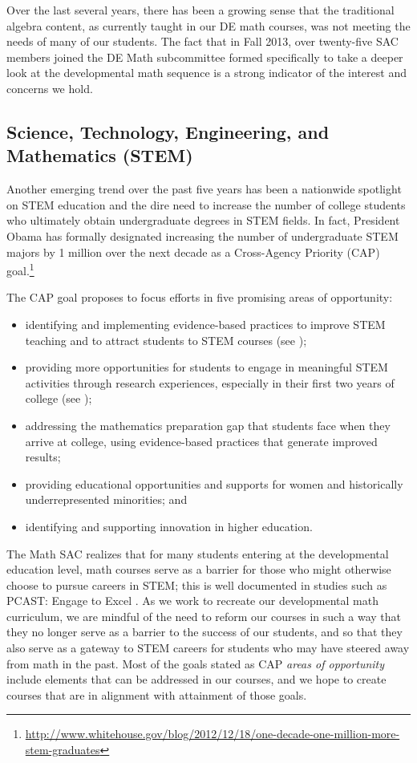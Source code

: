 Over the last several years, there has been a growing sense that the traditional
algebra content, as currently taught in our DE math courses, was not meeting the
needs of many of our students. The fact that in Fall 2013, over twenty-five SAC
members joined the DE Math subcommittee formed specifically to take a deeper
look at  the developmental math sequence is a strong indicator of the interest and
concerns we hold.

\subsection{Science, Technology, Engineering, and Mathematics (STEM)}
Another emerging trend over the past five years has been a nationwide spotlight
on STEM education and the dire need to increase the
number of college students who ultimately obtain undergraduate degrees in STEM fields. In
fact, President Obama has formally designated increasing the number of
undergraduate STEM majors by 1 million over the next decade as a Cross-Agency
Priority (CAP) 
goal.\footnote{\url{http://www.whitehouse.gov/blog/2012/12/18/one-decade-one-million-more-stem-graduates}}

The CAP goal proposes to focus efforts in five promising areas of opportunity:
\begin{itemize}
	\item identifying and implementing evidence-based practices to improve STEM teaching
	and to attract students to STEM courses (see
	);
	\item providing more opportunities for students to engage in meaningful  STEM
	activities through research experiences, especially in their first two years of
	college (see
	);
	\item addressing the mathematics preparation gap that students face when they arrive
	at college, using evidence-based practices that generate improved results;
	\item providing educational opportunities and supports for women and historically
	underrepresented minorities; and
	\item identifying and supporting innovation in higher
	education.
\end{itemize}

The Math SAC realizes that for many students entering at the developmental
education level, math courses serve as a barrier for those who might otherwise
choose to pursue careers in STEM; this is well documented in studies such as
PCAST: Engage to Excel \cite{engagetoexcel}. As we work to recreate our
developmental math curriculum, we are mindful of the need to reform our courses
in such a way that they no longer serve as a barrier to the success of our
students, and so that they also serve as a gateway to
STEM careers for students who may have steered away from math in the past.  Most
of the goals stated as CAP \emph{areas of opportunity} include elements that
can be addressed in our courses, and we hope to create courses that are in alignment with
attainment of those goals.

